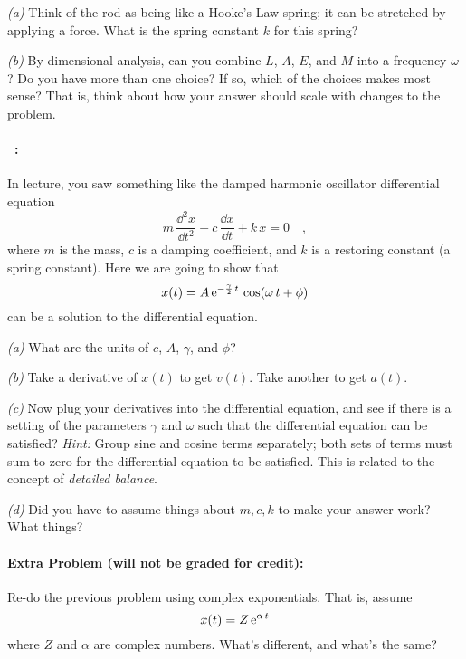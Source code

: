 \documentclass[12pt]{article}
\begin{document}
\textsl{(a)} Think of the rod as being like a Hooke's Law spring; it
can be stretched by applying a force.  What is the spring constant $k$
for this spring?

\textsl{(b)} By dimensional analysis, can you combine $L$, $A$, $E$,
and $M$ into a frequency $\omega$?  Do you have more than one choice?  If so,
which of the choices makes most sense? That is, think about how your
answer should scale with changes to the problem.

\paragraph{\problemname~\theproblem:}%
In lecture, you saw something like the damped harmonic oscillator
differential equation
\begin{equation}
m\,\frac{\dd^2 x}{\dd t^2} + c\,\frac{\dd x}{\dd t} + k\,x = 0 \quad ,
\end{equation}
where $m$ is the mass, $c$ is a damping coefficient, and $k$ is a
restoring constant (a spring constant).  Here we are going to show
that
\begin{equation}
x(t) = A\,\mathrm{e}^{-\frac{\gamma}{2}\,t}\,\cos (\omega\,t + \phi)
\end{equation}
can be a solution to the differential equation.

\textsl{(a)} What are the units of $c$, $A$, $\gamma$, and $\phi$?

\textsl{(b)} Take a derivative of $x(t)$ to get $v(t)$. Take another
to get $a(t)$.

\textsl{(c)} Now plug your derivatives into the differential equation,
and see if there is a setting of the parameters $\gamma$ and $\omega$
such that the differential equation can be satisfied? \emph{Hint:}
Group sine and cosine terms separately; both sets of terms must sum to
zero for the differential equation to be satisfied. This is related to
the concept of \emph{detailed balance}.

\textsl{(d)} Did you have to assume things about $m, c, k$ to make
your answer work? What things?

\paragraph{Extra Problem (will not be graded for credit):}%
Re-do the previous problem using complex exponentials. That is, assume
\begin{equation}
x(t) = Z\,\mathrm{e}^{\alpha\,t}
\end{equation}
where $Z$ and $\alpha$ are complex numbers. What's different, and
what's the same?
\end{document}
